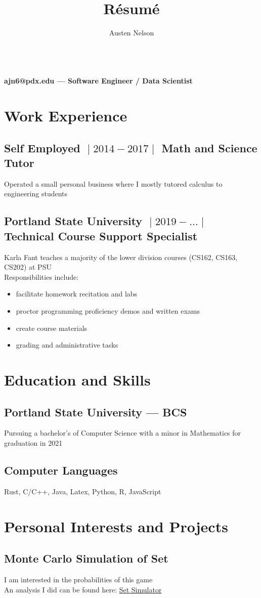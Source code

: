 \documentclass{article}
\title{R\'esum\'e}
\author{Austen Nelson}
\makeatletter
\renewcommand{\maketitle}
{
\begin{center}
\huge \bfseries \theauthor\\
\vspace{.25em}
\mdseries \normalsize ajn6@pdx.edu --- Software Engineer / Data Scientist
\end{center}
}
\makeatother
\begin{document}
\maketitle
\section{Work Experience}
\subsection{Self Employed $\;\vert\;2014-2017\;\vert\;$ Math and Science Tutor}
Operated a small personal business where I mostly tutored calculus to
engineering students
\subsection{Portland State University $\;\vert\;2019-\ldots\;\vert\;$ Technical Course Support Specialist}
Karla Fant teaches a majority of the lower division courses (CS162, CS163, CS202) at PSU\\
Responsibilities include:
\begin{itemize}
\item facilitate homework recitation and labs
\item proctor programming proficiency demos and written exams
\item create course materials
\item grading and administrative tasks
\end{itemize}
\section{Education and Skills}
\subsection{Portland State University --- BCS}
Pursuing a bachelor's of Computer Science with a minor in
Mathematics for graduation in 2021
\subsection{Computer Languages}
Rust,
C/C++,
Java,
Latex,
Python,
R,
JavaScript
\section{Personal Interests and Projects}
\subsection{Monte Carlo Simulation of Set\tiny\mdseries\textregistered}
I am interested in the probabilities of this game\\
An analysis I did can be found here:
\href{https://www.github.com/aujxn/set_game_simulator}{Set Simulator}
\end{document}
